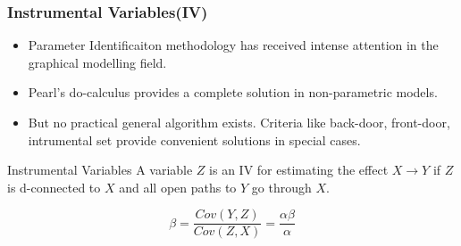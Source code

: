 \documentclass{beamer}
\begin{document}

\begin{frame}
	\frametitle{Instrumental Variables(IV)}
	\begin{itemize}
		\item Parameter Identificaiton methodology has received intense attention in the graphical modelling field.
		\item Pearl's do-calculus provides a complete solution in non-parametric models.
		\item But no practical general algorithm exists. Criteria like back-door, front-door, intrumental set provide convenient solutions in special cases.
	\end{itemize}

	\begin{block}{Instrumental Variables}
		A variable $ Z $ is an IV for estimating the effect $ X \rightarrow Y $
		if $ Z $ is d-connected to $ X $ and all open paths to $ Y $ go through
		$ X $.
	\end{block}
	\begin{figure}
		\centering
		\begin{subfigure}{0.5\linewidth}
		\end{subfigure}%
		\begin{subfigure}{0.5\linewidth}
			$$ \beta = \frac{Cov(Y, Z)}{Cov(Z, X)} = \frac{\alpha \beta}{\alpha}$$
		\end{subfigure}
	\end{figure}
\end{frame}
\end{document}
